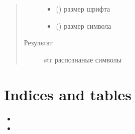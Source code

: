 \documentclass[letterpaper,10pt,russian]{sphinxmanual}
\begin{document}
\begin{fulllineitems}
\begin{fulllineitems}
\begin{quote}
\begin{description}
\begin{itemize}
\item {} 
 () \textendash{} размер шрифта

\item {} 
 () \textendash{} размер символа

\end{itemize}

\item[{Результат}] \leavevmode
str \textendash{} распознаные символы

\end{description}\end{quote}

\end{fulllineitems}


\end{fulllineitems}



\chapter{Indices and tables}
\label{\detokenize{index:indices-and-tables}}\begin{itemize}
\item {} 

\item {} 

\end{itemize}


\renewcommand{\indexname}{Содержание модулей Python}
\begin{sphinxtheindex}
\let\bigletter\sphinxstyleindexlettergroup
\bigletter{t}
\item\relax{}
\end{sphinxtheindex}

\renewcommand{\indexname}{Алфавитный указатель}
\printindex
\end{document}

